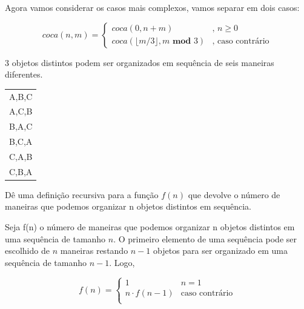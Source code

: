 \begin{exemplo}
Agora vamos considerar os casos mais complexos, vamos separar em dois casos:

$$coca(n,m) = 
\begin{cases}
coca(0, n+m) & \text{, $n \geq 0$}\\
coca(\lfloor m/3 \rfloor ,m \textbf{ mod } 3) & \text{, caso contrário} 
\end{cases}
$$

\end{exemplo}


\begin{exemplo}
3 objetos distintos podem ser organizados em sequência de seis maneiras diferentes.

\begin{center}
\begin{tabular}{c}
A,B,C\\
A,C,B\\
B,A,C\\
B,C,A\\
C,A,B\\
C,B,A\\
\end{tabular}
\end{center}

Dê uma definição recursiva para a função $f(n)$ que devolve o número de maneiras que podemos organizar n objetos distintos em sequência.

Seja f(n) o número de maneiras que podemos organizar n objetos distintos em uma sequência de tamanho $n$. O primeiro elemento de uma sequência pode ser escolhido de $n$ maneiras restando $n-1$ objetos para ser organizado em uma sequência de tamanho $n-1$. Logo,

$$
f(n) = 
\begin{cases}
1 & n = 1\\
n \cdot f(n-1) & \text{caso contrário}\\
\end{cases}
$$

\end{exemplo}

